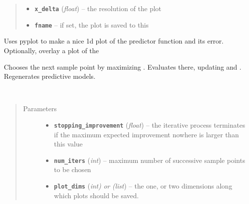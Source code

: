 \documentclass[letterpaper,10pt,english]{sphinxmanual}
\begin{document}
\begin{fulllineitems}
\begin{fulllineitems}
\begin{quote}
\begin{description}
\begin{itemize}
\item {} 
\textbf{\texttt{x\_delta}} (\emph{float}) -- the resolution of the plot

\item {} 
\textbf{\texttt{fname}} -- if set, the plot is saved to this

\end{itemize}

\end{description}\end{quote}

Uses pyplot to make a nice 1d plot of the predictor function and its error. Optionally, overlay a plot of the

\end{fulllineitems}


\begin{fulllineitems}
\label{index:smbo.smb_optimizer.smb_optimizer.sample}
Chooses the next sample point by maximizing .
Evaluates  there, updating  and . Regenerates predictive models.

\end{fulllineitems}


\begin{fulllineitems}
\label{index:smbo.smb_optimizer.smb_optimizer.take_samples}~\begin{quote}\begin{description}
\item[{Parameters}] \leavevmode\begin{itemize}
\item {} 
\textbf{\texttt{stopping\_improvement}} (\emph{float}) -- the iterative process terminates if the maximum expected improvement nowhere is larger than this value

\item {} 
\textbf{\texttt{num\_iters}} (\emph{int}) -- maximum number of successive sample points to be chosen

\item {} 
\textbf{\texttt{plot\_dims}} (\emph{int) or (list}) -- the one, or two dimensions along which plots should be saved.


\end{itemize}
\end{description}
\end{quote}
\end{fulllineitems}
\end{fulllineitems}
\end{document}
